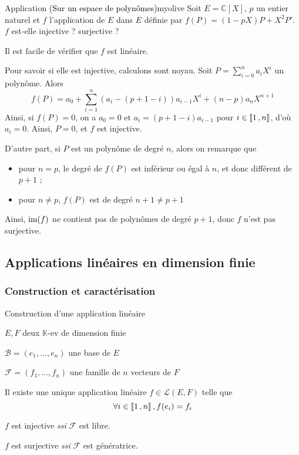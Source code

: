     \begin{omed}{Application \textcolor{black}{(Sur un espace de polynômes)}}{myolive}
        Soit $E = \mathbb{C}[X]$, $p$ un entier naturel et $f$ l’application de $E$ dans $E$ définie par $f(P) = (1 - pX)P + X^2 P'$. $f$ est-elle injective ? surjective ?

        Il est facile de vérifier que $f$ est linéaire. 
        
        Pour savoir si elle est injective, calculons sont noyau. Soit $P = \sum_{i=0}^{n} a_i X^i$ un polynôme. Alors 
        \[ f(P) = a_0 + \sum_{i=1}^{n} (a_i - (p+1-i))a_{i-1} X^i + (n-p)a_n X^{n+1} \]   
        Ainsi, si $f(P) = 0$, on a $a_0 = 0$ et $a_i = (p + 1 - i)a_{i - 1}$ pour $i \in \left\llbracket 1 \, , n \right\rrbracket$, d’où $a_i = 0$. Ainsi, $P = 0$, et $f$ est injective.
        
        D’autre part, si $P$ est un polynôme de degré $n$, alors on remarque que 
        \begin{itemize}
            \item pour $n = p$, le degré de $f(P)$ est inférieur ou égal à $n$, et donc différent de $p+1$ ;
            \item pour $n \neq p$, $f(P)$ est de degré $n + 1 \neq p+ 1$
        \end{itemize}
        Ainsi, $\operatorname{im}(f)$ ne contient pas de polynômes de degré $p + 1$, donc $f$ n’est pas surjective.
    \end{omed}

\subsection{Applications linéaires en dimension finie}

    \subsubsection{Construction et caractérisation}

    \begin{theo}{Construction d’une application linéaire}{}
        \begin{soient}
            \item $E,F$ deux $\mathbb{K}$-ev de dimension finie
            \item $\mathcal{B} = (e_1, \ldots, e_n)$ une base de $E$
            \item $\mathcal{F} = (f_1,\ldots,f_n)$ une famille de $n$ vecteurs de $F$ 
        \end{soient}
        \begin{alors}
            \item Il existe une unique application linéaire $f \in \mathcal{L}(E,F)$ telle que 
            \[ \forall i \in \left\llbracket 1 \, , n \right\rrbracket, f(e_i) = f_i \]
            \item $f$ est injective \textit{ssi} $\mathcal{F}$ est libre.
            \item $f$ est surjective \textit{ssi} $\mathcal{F}$ est génératrice.
        \end{alors}
    \end{theo}

